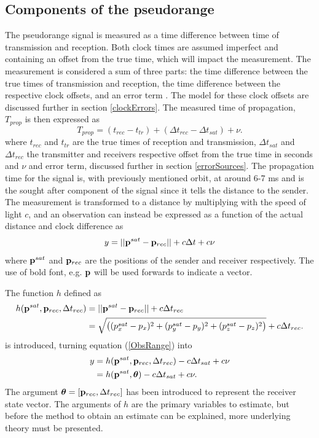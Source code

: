 \subsection{Components of the pseudorange} \label{pseudorangeComponents}
The pseudorange signal is measured as a time difference between time of transmission and reception. Both clock times are assumed imperfect and containing an offset from the true time, which will impact the measurement. The measurement is considered a sum of three parts: the time difference between the true times of transmission and reception, the time difference between the respective clock offsets, and an error term \cite{6748618}. The model for these clock offsets are discussed further in section \ref{clockErrors}. The measured time of propagation, $T_{prop}$ is then expressed as
\begin{equation}\label{t_prop}
T_{prop}=(t_{rec}-t_{tr})+(\Delta t_{rec}-\Delta t_{sat})+\nu.
\end{equation}
where $t_{rec}$ and $t_{tr}$ are the true times of reception and transmission, $\Delta t_{sat}$ and $\Delta t_{rec}$ the transmitter and receivers respective offset from the true time in seconds and $\nu$ and error term, discussed further in section \ref{errorSources}. The propagation time for the signal is, with previously mentioned orbit, at around 6-7 ms and is the sought after component of the signal since it tells the distance to the sender. The measurement is transformed to a distance by multiplying with the speed of light $c$, and an observation can instead be expressed as a function of the actual distance and clock difference as
\begin{equation} \label{ObsRange}
y=||{\bf p}^{sat}-{\bf p}_{rec}||+c\Delta t+c\nu
\end{equation}
where ${\bf p}^{sat}$ and ${\bf p}_{rec}$ are the positions of the sender and receiver respectively. The use of bold font, e.g. $\bf p$ will be used forwards to indicate a vector. 
\par
The function $h$ defined as
\begin{align}\label{hModel}
h({\bf p}^{sat},{\bf p}_{rec},\Delta t_{rec}) &= ||{\bf p}^{sat}-{\bf p}_{rec}||+c\Delta t_{rec} \nonumber\\
				 &= \sqrt{\left((p^{sat}_x- p_x)^2+(p^{sat}_y-p_y)^2+(p^{sat}_z-p_z)^2\right)}+c\Delta t_{rec}.
\end{align}
is introduced, turning equation (\ref{ObsRange}) into
\begin{align} \label{singleObs}
y &=h({\bf p}^{sat}, {\bf p}_{rec},\Delta t_{rec})-c\Delta t_{sat} +c\nu\\
	&=h({\bf p}^{sat}, {\boldsymbol \theta })-c\Delta t_{sat} +c\nu.
\end{align}
The argument $\boldsymbol \theta=[{\bf p}_{rec},\Delta t_{rec}]$ has been introduced to represent the receiver state vector. The arguments of $h$ are the primary variables to estimate, but before the method to obtain an estimate can be explained, more underlying theory must be presented.

